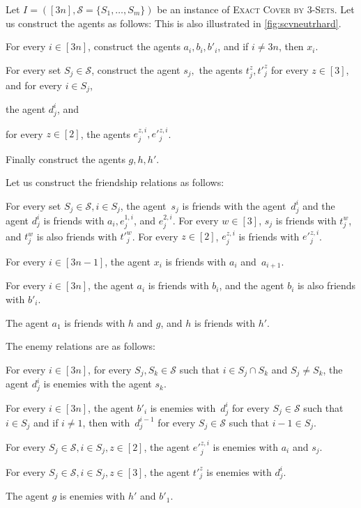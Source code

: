 \documentclass[a4paper,fleqn]{cas-sc}
\newcommand{\probname}[1]{\textsc{#1}}
\newcommand{\sets}{\ensuremath{\mathcal{S}}}
\newcommand{\elements}{\ensuremath{[3n]}}
\newcommand{\sset}[1]{\ensuremath{S_{#1}}}
\begin{document}
{Let $I = (\elements, \sets = \{S_1, \dots, S_m\})$ be an instance of \probname{Exact Cover by 3-Sets}.
Let us construct the agents as follows: This is also illustrated in \cref{fig:scvneutrhard}.
\begin{compactitem}
\item For every $i \in \elements$, construct the agents $a_i, b_i, b'_i$, and if $i \neq 3n$, then $x_i$.
\item For every set $\sset j \in \sets$, construct the agent $s_j,$ the agents $t^z_j, t'^z_j$ for every $z \in [3]$, and for every $i \in \sset j$, \begin{compactitem}
\item the agent $d^i_j$, and
\item for every $z \in [2]$, the agents $e^{z,i}_j, e'^{z,i}_j$.
\end{compactitem}
\item Finally construct the agents $g, h, h'$.
\end{compactitem}

Let us construct the friendship relations as follows:
\begin{compactitem}
\item For every set $\sset j \in \sets, i \in \sset j$,  the agent~$s_j$ is friends with the agent~$d^i_j$ and the agent $d^i_j$ is friends with $a_i, e^{1,i}_j$, and $e^{2,i}_j$.
For every $w \in [3]$, $s_j$ is friends with $t^w_j$, and $t^w_j$ is also friends with $t'^w_j$.
For every $z \in [2]$, $e^{z,i}_j$ is friends with $e'^{z,i}_j$.
\item For every $i \in [3n - 1]$, the agent $x_i$ is friends with $a_i$ and~$a_{i + 1}$.
\item For every $i \in [3n]$, the agent $a_i$ is friends with $b_i$, and the agent $b_i$ is also friends with $b'_i$.
\item The agent $a_1$ is friends with $h$ and $g$, and $h$ is friends with $h'$.
 \end{compactitem}
The enemy relations are as follows:
\begin{compactitem}
\item For every $i \in \elements$, for every $\sset j, \sset k \in \sets$ such that $i \in \sset j \cap \sset k$ and $\sset j \neq \sset k$, the agent $d^i_j$ is enemies with the agent $s_k$.
\item For every $i \in \elements$, the agent $b'_i$ is enemies with~$d^i_j$ for every $\sset j \in \sets$ such that $i \in \sset j$ and if $i \neq 1$, then with~$d^{i - 1}_j$ for every $\sset j \in \sets$ such that $i - 1 \in \sset j$.
\item For every $\sset j \in \sets, i \in \sset j, z \in [2]$, the agent $e'^{z,i}_j$ is enemies with $a_i$ and $s_j$.
\item For every $\sset j \in \sets, i \in \sset j, z \in [3]$, the agent $t'^{z}_j$ is enemies with $d^i_j$.
\item The agent $g$ is enemies with $h'$ and $b'_1$.
\end{compactitem}

}
\end{document}
